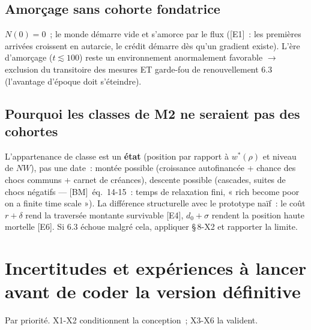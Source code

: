 \documentclass[11pt,a4paper]{article}
\newcommand{\NW}{\mathit{NW}}
\begin{document}
\subsection{Amorçage sans cohorte fondatrice}
\label{sec:amorcage}

$N(0)=0$~; le monde démarre vide et s'amorce par le flux ([E1]~: les premières arrivées croissent en autarcie, le crédit démarre dès qu'un gradient existe). L'ère d'amorçage ($t\lesssim 100$) reste un environnement anormalement favorable $\to$ exclusion du transitoire des mesures ET garde-fou de renouvellement 6.3 (l'avantage d'époque doit s'éteindre).

\subsection{Pourquoi les classes de M2 ne seraient pas des cohortes}
\label{sec:classes-etats}

L'appartenance de classe est un \textbf{état} (position par rapport à $w^*(\rho)$ et niveau de $\NW$), pas une date~: montée possible (croissance autofinancée + chance des chocs communs + carnet de créances), descente possible (cascades, suites de chocs négatifs --- [BM]~éq.~14-15~: temps de relaxation fini, « rich become poor on a finite time scale »). La différence structurelle avec le prototype naïf~: le coût $r+\delta$ rend la traversée montante survivable [E4], $d_0+\sigma$ rendent la position haute mortelle [E6]. Si 6.3 échoue malgré cela, appliquer \S\,8-X2 et rapporter la limite.

\section{Incertitudes et expériences à lancer avant de coder la version définitive}
\label{sec:incertitudes}

Par priorité. X1-X2 conditionnent la conception~; X3-X6 la valident.
\end{document}

